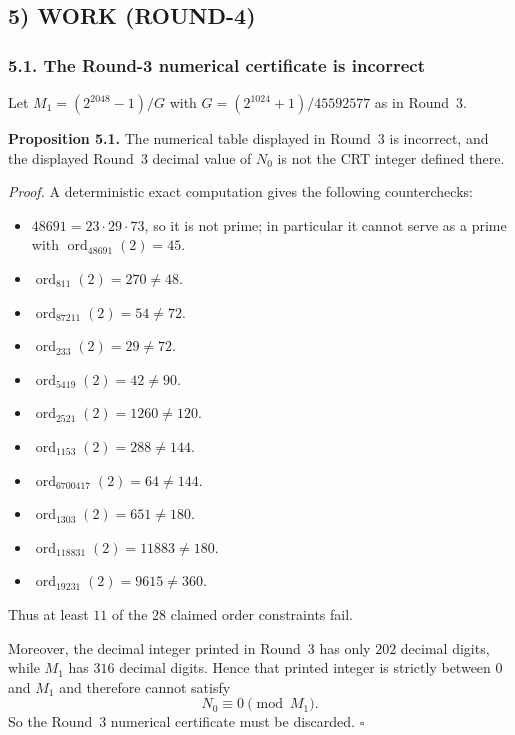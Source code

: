 \subsection*{5) WORK (ROUND-4)}

\subsubsection*{5.1. The Round-3 numerical certificate is incorrect}

Let $M_1=(2^{2048}-1)/G$ with $G=(2^{1024}+1)/45592577$ as in Round~3.

\medskip
\noindent\textbf{Proposition 5.1.}
The numerical table displayed in Round~3 is incorrect, and the displayed Round~3 decimal value of $N_0$ is not the CRT integer defined there.

\medskip
\noindent\emph{Proof.}
A deterministic exact computation gives the following counterchecks:

\begin{itemize}
\item $48691=23\cdot 29\cdot 73$, so it is not prime; in particular it cannot serve as a prime with $\operatorname{ord}_{48691}(2)=45$.
\item $\operatorname{ord}_{811}(2)=270\neq 48$.
\item $\operatorname{ord}_{87211}(2)=54\neq 72$.
\item $\operatorname{ord}_{233}(2)=29\neq 72$.
\item $\operatorname{ord}_{5419}(2)=42\neq 90$.
\item $\operatorname{ord}_{2521}(2)=1260\neq 120$.
\item $\operatorname{ord}_{1153}(2)=288\neq 144$.
\item $\operatorname{ord}_{6700417}(2)=64\neq 144$.
\item $\operatorname{ord}_{1303}(2)=651\neq 180$.
\item $\operatorname{ord}_{118831}(2)=11883\neq 180$.
\item $\operatorname{ord}_{19231}(2)=9615\neq 360$.
\end{itemize}

Thus at least $11$ of the $28$ claimed order constraints fail.

Moreover, the decimal integer printed in Round~3 has only $202$ decimal digits, while $M_1$ has $316$ decimal digits. Hence that printed integer is strictly between $0$ and $M_1$ and therefore cannot satisfy
\[
N_0\equiv 0\pmod{M_1}.
\]
So the Round~3 numerical certificate must be discarded. \hfill$\square$

